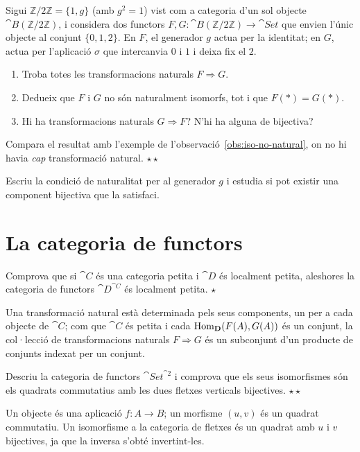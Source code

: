\begin{exercici}
Sigui $\mathbb{Z}/2\mathbb{Z}=\{1,g\}$ (amb $g^2=1$) vist com a categoria d'un sol objecte $\cat{B}(\mathbb{Z}/2\mathbb{Z})$, i considera dos functors $F,G\colon\cat{B}(\mathbb{Z}/2\mathbb{Z})\to\cat{Set}$ que envien l'únic objecte al conjunt $\{0,1,2\}$. En $F$, el generador $g$ actua per la identitat; en $G$, actua per l'aplicació $\sigma$ que intercanvia $0$ i $1$ i deixa fix el $2$.
\begin{enumerate}
  \item Troba totes les transformacions naturals $F\Rightarrow G$.
  \item Dedueix que $F$ i $G$ no són naturalment isomorfs, tot i que $F(\ast)=G(\ast)$.
  \item Hi ha transformacions naturals $G\Rightarrow F$? N'hi ha alguna de bijectiva?
\end{enumerate}
Compara el resultat amb l'exemple de l'observació~\ref{obs:iso-no-natural}, on no hi havia \emph{cap} transformació natural. \hfill{\normalfont$\star\star$}
\begin{indicacio}
Escriu la condició de naturalitat per al generador $g$ i estudia si pot existir una component bijectiva que la satisfaci.
\end{indicacio}
\end{exercici}

\section{La categoria de functors}

\begin{exercici}
Comprova que si $\cat{C}$ és una categoria petita i $\cat{D}$ és localment petita, aleshores la categoria de functors $\cat{D}^{\cat{C}}$ és localment petita. \hfill{\normalfont$\star$}
\begin{indicacio}
Una transformació natural està determinada pels seus components, un per a cada objecte de $\cat{C}$; com que $\cat{C}$ és petita i cada $\operatorname{Hom}_{\mathbf{D}}(F(A),G(A))$ és un conjunt, la col·lecció de transformacions naturals $F\Rightarrow G$ és un subconjunt d'un producte de conjunts indexat per un conjunt.
\end{indicacio}
\end{exercici}

\begin{exercici}
Descriu la categoria de functors $\cat{Set}^{\cat{2}}$ i comprova que els seus isomorfismes són els quadrats commutatius amb les dues fletxes verticals bijectives. \hfill{\normalfont$\star\star$}
\begin{indicacio}
Un objecte és una aplicació $f\colon A\to B$; un morfisme $(u,v)$ és un quadrat commutatiu. Un isomorfisme a la categoria de fletxes és un quadrat amb $u$ i $v$ bijectives, ja que la inversa s'obté invertint-les.
\end{indicacio}
\end{exercici}

